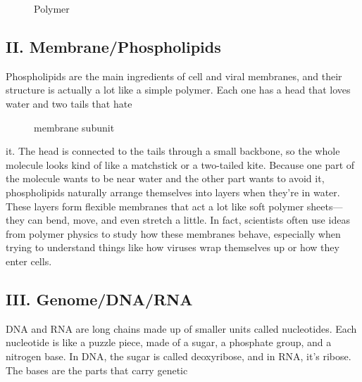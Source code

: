 \documentclass[12pt]{article}
\begin{document}
\begin{flushleft}
\begin{figure}[!ht]
  \centering
  
  \caption{Polymer}
\end{figure}





\subsection*{II. Membrane/Phospholipids}
Phospholipids are the main ingredients of cell and viral membranes, and their structure is actually a lot like a simple polymer. Each one has a head that loves water and two tails that hate 

\begin{figure}[!ht]
  \centering
  \caption{membrane subunit}
\end{figure}



\noindent it. The head is connected to the tails through a small backbone, so the whole molecule looks kind of like a matchstick or a two-tailed kite. Because one part of the molecule wants to be near water and the other part wants to avoid it, phospholipids naturally arrange themselves into layers when they’re in water. These layers form flexible membranes that act a lot like soft polymer sheets—they can bend, move, and even stretch a little. In fact, scientists often use ideas from polymer physics to study how these membranes behave, especially when trying to understand things like how viruses wrap themselves up or how they enter cells.





\subsection*{III. Genome/DNA/RNA}
DNA and RNA are long chains made up of smaller units called nucleotides. Each nucleotide is like a puzzle piece, made of a sugar, a phosphate group, and a nitrogen base. In DNA, the sugar is called deoxyribose, and in RNA, it’s ribose. The bases are the parts that carry genetic 


\end{flushleft}
\end{document}
